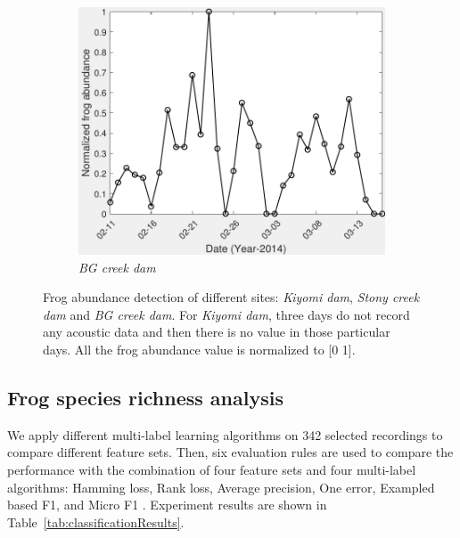\begin{figure}[htb!]
               ~
              \begin{subfigure}[b]{0.3\textwidth}
                \includegraphics[width=\textwidth]{image/Ch7/abundance1079.pdf}     
                \caption{\textit{BG creek dam}}           
        \end{subfigure}       
\caption[Frog abundance detection of different sites]{Frog abundance detection of different sites: \textit{Kiyomi dam}, \textit{Stony creek dam} and \textit{BG creek dam}. For \textit{Kiyomi dam}, three days do not record any acoustic data and then there is no value in those particular days. All the frog abundance value is normalized to [0 1].}
        \label{fig:frogAbundance}
\end{figure}



\subsection{Frog species richness analysis}
We apply different multi-label learning algorithms on 342 selected recordings to compare different feature sets. Then, six evaluation rules are used to compare the performance with the combination of four feature sets and four multi-label algorithms: Hamming loss, Rank loss, Average precision, One error, Exampled based F1, and Micro F1 \cite{Madjarov20123084, ZhangReview2014}. 
Experiment results are shown in Table~\ref{tab:classificationResults}.

